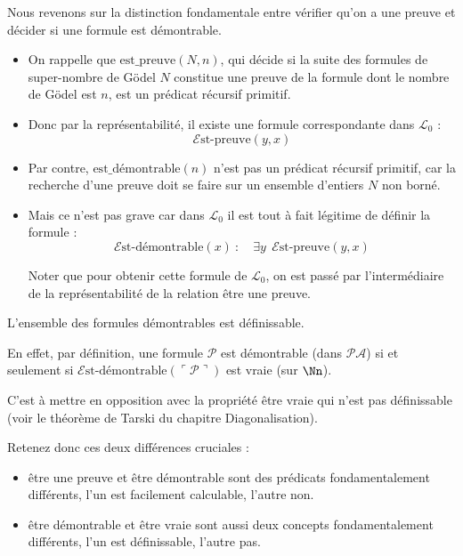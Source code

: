 \documentclass[11pt,class=report,crop=false]{standalone}
\begin{document}
Nous revenons sur la distinction fondamentale entre vérifier qu'on a une preuve et décider si une formule est démontrable.

\begin{itemize}
    \item On rappelle que $\text{est\_preuve}(N, n)$, qui décide si la suite des formules de super-nombre de Gödel $N$ constitue une preuve de la formule dont le nombre de Gödel est $n$, est un prédicat récursif primitif.
    
    \item Donc par la représentabilité, il existe une formule correspondante dans $\mathcal{L}_0$ : 
    \[
    \mathcal{E}\text{st-preuve}(y, x)
    \]
    
    \item Par contre, $\text{est\_démontrable}(n)$ n'est pas un prédicat récursif primitif, car la recherche d'une preuve doit se faire sur un ensemble d'entiers $N$ non borné.

    \item Mais ce n'est pas grave car dans $\mathcal{L}_0$ il est tout à fait légitime de définir la formule :
\[ \mathcal{E}\text{st-démontrable}(x) \ : \quad \exists y \ \ \mathcal{E}\text{st-preuve}(y,x) \]

Noter que pour obtenir cette formule de $\mathcal{L}_0$, on est passé par l'intermédiaire de la représentabilité de la relation \og{}être une preuve\fg{}.
\end{itemize}


\begin{corollaire}
    L'ensemble des formules démontrables est définissable.
\end{corollaire}

En effet, par définition, une formule $\mathcal{P}$ est démontrable (dans $\mathcal{PA}$) si et seulement si $\mathcal{E}\text{st-démontrable}(\ulcorner \mathcal{P} \urcorner)$ est vraie (sur $\Nn$).

C'est à mettre en opposition avec la propriété \og{}être vraie\fg{} qui n'est pas définissable (voir le théorème de Tarski du chapitre \og{}Diagonalisation\fg{}).

Retenez donc ces deux différences cruciales :
\begin{itemize}
    \item \og{}être une preuve\fg{} et \og{}être démontrable\fg{} sont des prédicats fondamentalement différents, l'un est facilement calculable, l'autre non.
    \item \og{}être démontrable\fg{} et \og{}être vraie\fg{} sont aussi deux concepts fondamentalement différents, l'un est définissable, l'autre pas.
\end{itemize}
\end{document}

